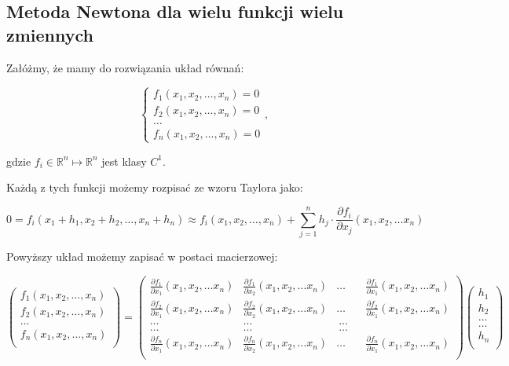 \documentclass{article}
\begin{document}
\subsection{Metoda Newtona dla wielu funkcji wielu zmiennych}

Załóżmy, że mamy do rozwiązania układ równań:

$$\left\{\begin{matrix}
f_1(x_1, x_2, \ldots, x_n) = 0 \\ 
f_2(x_1, x_2, \ldots, x_n) = 0 \\ 
\ldots\\ 
f_n(x_1, x_2, \ldots, x_n) = 0
\end{matrix}\right.,$$

gdzie $f_i \in \mathbb{R}^n \mapsto \mathbb{R}^n$ jest klasy $C^{1}$.

Każdą z tych funkcji możemy rozpisać ze wzoru Taylora jako:

$$0 = f_i(x_1 + h_1, x_2 + h_2, \ldots, x_n + h_n) \approx f_i(x_1, x_2, \ldots, x_n) + \sum_{j=1}^n h_j \cdot \frac{\partial f_i}{\partial x_j} (x_1, x_2, \ldots x_n)$$

Powyższy układ możemy zapisać w postaci macierzowej:

$$
\begin{pmatrix}
f_1(x_1, x_2, \ldots, x_n)\\ 
f_2(x_1, x_2, \ldots, x_n)\\ 
\ldots\\ 
f_n(x_1, x_2, \ldots, x_n)\\ 

\end{pmatrix} = \begin{pmatrix}
\frac{\partial f_1}{\partial x_1}(x_1, x_2, \ldots x_n) & \frac{\partial f_1}{\partial x_2}(x_1, x_2, \ldots x_n) &  \ldots &  & \frac{\partial f_1}{\partial x_1}(x_1, x_2, \ldots x_n) \\ 
\frac{\partial f_2}{\partial x_1}(x_1, x_2, \ldots x_n) & \frac{\partial f_2}{\partial x_2}(x_1, x_2, \ldots x_n) &  \ldots &  & \frac{\partial f_2}{\partial x_1}(x_1, x_2, \ldots x_n) \\ 
 \ldots & \ldots &  \ \ldots & \\ 
 \ldots & \ldots &  \ \ldots & \\ 
\frac{\partial f_n}{\partial x_1}(x_1, x_2, \ldots x_n) & \frac{\partial f_n}{\partial x_2}(x_1, x_2, \ldots x_n) &  \ldots &  & \frac{\partial f_n}{\partial x_1}(x_1, x_2, \ldots x_n) \\ 
\end{pmatrix} \begin{pmatrix}
h_1\\ 
h_2\\ 
\ldots \\ 
\ldots \\ 
h_n\\ 

\end{pmatrix}
$$
\end{document}
